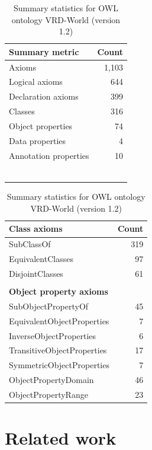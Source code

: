 \documentclass[]{jair}
\begin{document}
\begin{table}[t]
\footnotesize
\caption{\footnotesize Summary statistics for OWL ontology VRD-World (version 1.2)}
\label{tab:onto-metrics}
\begin{center}
\begin{tabular}{l|r}
\toprule
\textbf{Summary metric} & \textbf{Count} \\
\midrule
Axioms & 1,103 \\
Logical axioms &  644 \\
Declaration axioms & 399 \\
Classes & 316 \\
Object properties & 74 \\
Data properties & 4 \\ 
Annotation properties & 10 \\
 \\
 \\
 \\
 \\
 \\
 \\
\bottomrule 
\end{tabular}
\quad
\begin{tabular}{l|r}
\toprule
\textbf{Class axioms} & \textbf{Count} \\
\midrule
SubClassOf & 319 \\
EquivalentClasses & 97 \\
DisjointClasses & 61 \\
\\
\toprule
\textbf{Object property axioms} &  \\
\midrule
SubObjectPropertyOf & 45 \\ 
EquivalentObjectProperties & 7 \\
InverseObjectProperties & 6 \\ 
TransitiveObjectProperties & 17 \\ 
SymmetricObjectProperties & 7 \\
ObjectPropertyDomain & 46 \\
ObjectPropertyRange & 23 \\
\bottomrule
\end{tabular}
\end{center}
\end{table}







\section{Related work}
\label{sec:related-work}
\end{document}
